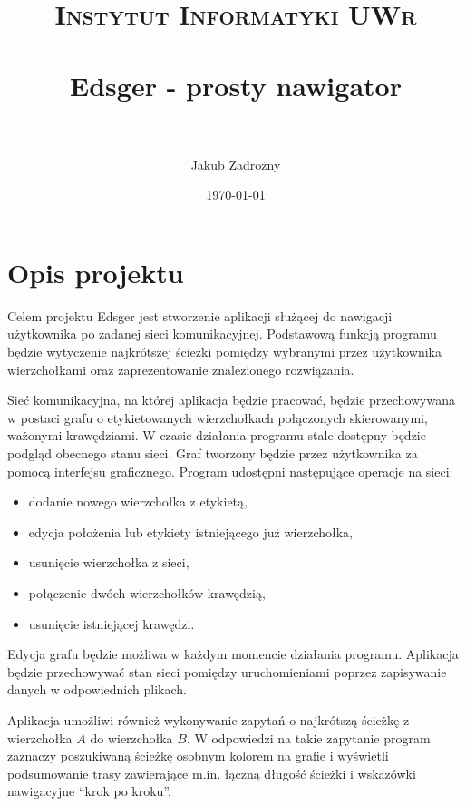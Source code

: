 \documentclass[paper=a4, fontsize=11pt]{scrartcl} %
\title{	
\normalfont \normalsize 
\textsc{Instytut Informatyki UWr} \\ [25pt] %
\horrule{0.5pt} \\[0.4cm] %
\huge Edsger - prosty nawigator \\ %
\horrule{0.5pt} \\[0.4cm] %
}
\author{Jakub Zadrożny} %
\date{\normalsize\today} %
\begin{document}

\maketitle %

\section*{Opis projektu}

Celem projektu Edsger jest stworzenie aplikacji służącej do nawigacji użytkownika po zadanej sieci komunikacyjnej. Podstawową funkcją programu będzie wytyczenie najkrótszej ścieżki pomiędzy wybranymi przez użytkownika wierzchołkami oraz zaprezentowanie znalezionego rozwiązania.

Sieć komunikacyjna, na której aplikacja będzie pracować, będzie przechowywana w postaci grafu o etykietowanych wierzchołkach połączonych skierowanymi, ważonymi krawędziami. W czasie działania programu stale dostępny będzie podgląd obecnego stanu sieci. Graf tworzony będzie przez użytkownika za pomocą interfejsu graficznego. Program udostępni następujące operacje na sieci:
\begin{itemize}
\item dodanie nowego wierzchołka z etykietą,
\item edycja położenia lub etykiety istniejącego już wierzchołka,
\item usunięcie wierzchołka z sieci,
\item połączenie dwóch wierzchołków krawędzią,
\item usunięcie istniejącej krawędzi.
\end{itemize}
Edycja grafu będzie możliwa w każdym momencie działania programu. Aplikacja będzie przechowywać stan sieci pomiędzy uruchomieniami poprzez zapisywanie danych w odpowiednich plikach.

Aplikacja umożliwi również wykonywanie zapytań o najkrótszą ścieżkę z wierzchołka $A$ do wierzchołka $B$. W odpowiedzi na takie zapytanie program zaznaczy poszukiwaną ścieżkę osobnym kolorem na grafie i wyświetli podsumowanie trasy zawierające m.in. łączną długość ścieżki i wskazówki nawigacyjne ``krok po kroku''.
\end{document}
